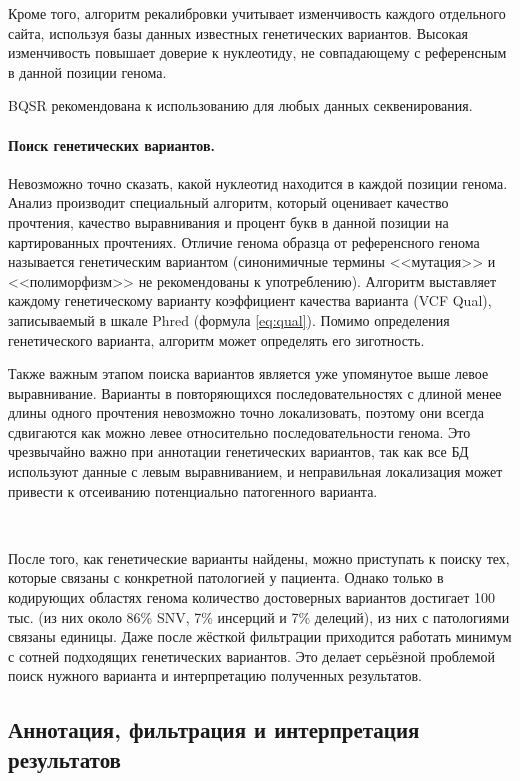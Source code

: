 \documentclass[a4paper,12pt]{article}
\begin{document}
Кроме того, алгоритм рекалибровки учитывает изменчивость каждого отдельного сайта, используя базы данных известных генетических вариантов.
Высокая изменчивость повышает доверие к нуклеотиду, не совпадающему с референсным в данной позиции генома.

BQSR рекомендована к использованию для любых данных секвенирования\cite{gatk}.

\paragraph{Поиск генетических вариантов.}
Невозможно точно сказать, какой нуклеотид находится в каждой позиции генома.
Анализ производит специальный алгоритм, который оценивает качество прочтения, качество выравнивания и процент букв в данной позиции на картированных прочтениях.
Отличие генома образца от референсного генома называется генетическим вариантом (синонимичные термины <<мутация>> и <<полиморфизм>> не рекомендованы к употреблению\cite{richards}).
Алгоритм выставляет каждому генетическому варианту коэффициент качества варианта (VCF Qual), записываемый в шкале Phred (формула \ref{eq:qual}).
Помимо определения генетического варианта, алгоритм может определять его зиготность.

Также важным этапом поиска вариантов является уже упомянутое выше левое выравнивание.
Варианты в повторяющихся последовательностях с длиной менее длины одного прочтения невозможно точно локализовать, поэтому они всегда сдвигаются как можно левее относительно последовательности генома.
Это чрезвычайно важно при аннотации генетических вариантов, так как все БД используют данные с левым выравниванием, и неправильная локализация может привести к отсеиванию потенциально патогенного варианта.

~

После того, как генетические варианты найдены, можно приступать к поиску тех, которые связаны с конкретной патологией у пациента.
Однако только в кодирующих областях генома количество достоверных вариантов достигает 100 тыс. (из них около 86\% SNV, 7\% инсерций и 7\% делеций)\cite{supernat}, из них с патологиями связаны единицы.
Даже после жёсткой фильтрации приходится работать минимум с сотней подходящих генетических вариантов.
Это делает серьёзной проблемой поиск нужного варианта и интерпретацию полученных результатов.

\subsection{Аннотация, фильтрация и интерпретация результатов}
\end{document}
